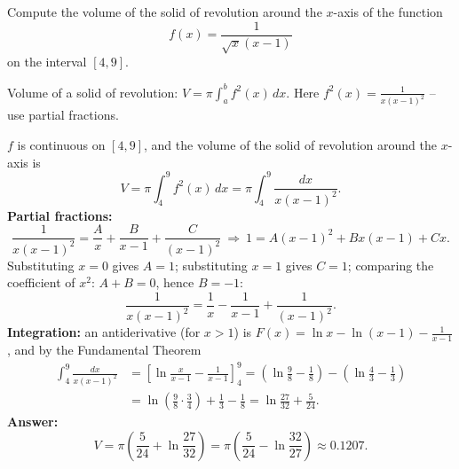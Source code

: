 
\begin{question}
Compute the volume of the solid of revolution around the $x$-axis of the function
\[ f(x)=\frac{1}{\sqrt{x}(x-1)} \]
on the interval $[4,9]$.
\end{question}

\begin{hint}
Volume of a solid of revolution: $V=\pi\int_a^b f^2(x)\,dx$. Here $f^2(x)=\frac1{x(x-1)^2}$ -- use partial fractions.
\end{hint}

\begin{solution}
$f$ is continuous on $[4,9]$, and the volume of the solid of revolution around the $x$-axis is
\[ V=\pi\int_4^9f^2(x)\,dx=\pi\int_4^9\frac{dx}{x(x-1)^2}. \]
\textbf{Partial fractions:}
\[ \frac1{x(x-1)^2}=\frac Ax+\frac B{x-1}+\frac C{(x-1)^2}\ \Longrightarrow\ 1=A(x-1)^2+Bx(x-1)+Cx. \]
Substituting $x=0$ gives $A=1$; substituting $x=1$ gives $C=1$; comparing the coefficient of $x^2$: $A+B=0$, hence $B=-1$:
\[ \frac1{x(x-1)^2}=\frac1x-\frac1{x-1}+\frac1{(x-1)^2}. \]
\textbf{Integration:} an antiderivative (for $x>1$) is $F(x)=\ln x-\ln(x-1)-\frac1{x-1}$, and by the Fundamental Theorem
\begin{align*}
\int_4^9\frac{dx}{x(x-1)^2}&=\left[\ln\frac{x}{x-1}-\frac1{x-1}\right]_4^9=\left(\ln\frac98-\frac18\right)-\left(\ln\frac43-\frac13\right)\\
&=\ln\left(\frac98\cdot\frac34\right)+\frac13-\frac18=\ln\frac{27}{32}+\frac5{24}.
\end{align*}
\textbf{Answer:}
\[ V=\pi\left(\frac5{24}+\ln\frac{27}{32}\right)=\pi\left(\frac5{24}-\ln\frac{32}{27}\right)\approx0.1207. \]
\end{solution}
